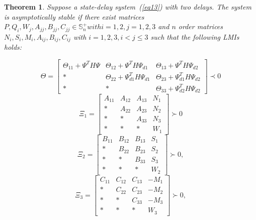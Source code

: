 \documentclass[a4paper]{cas-sc}
\newtheorem{theorem}{Theorem}
\begin{document}
\begin{theorem}
  Suppose a state-delay system~(\ref{eq13}) with two delays. The system is asymptotically stable if there exist matrices $P,Q_i,W_j,A_{jj},B_{jj},C_{jj}\in\mathbb{S}_n^+ with i=1,2,j=1,2,3$ and $n$ order matrices $N_i,S_i,M_i,A_{ij},B_{ij},C_{ij}$ with $i=1,2,3,i<j\le3$ such that the following LMIs holds:

  \begin{equation}
    \Theta  = \left[ {\begin{array}{*{20}{c}}
            {{\Theta _{11}} + {\Psi ^T}H\Psi } & {{\Theta _{12}} + {\Psi ^T}H{\Psi _{d1}}}    & {{\Theta _{13}} + {\Psi ^T}H{\Psi _{d2}}}    \\
            *                                  & {{\Theta _{22}} + \Psi _{d1}^TH{\Psi _{d1}}} & {{\Theta _{23}} + \Psi _{d1}^TH{\Psi _{d2}}} \\
            *                                  & *                                            & {{\Theta _{33}} + \Psi _{d2}^TH{\Psi _{d2}}}
          \end{array}} \right] \prec 0
    \label{eq42}
  \end{equation}
  \begin{equation}
    {\Xi _1} = \left[ {\begin{array}{*{20}{c}}
            {{A_{11}}} & {{A_{12}}} & {{A_{13}}} & {{N_1}} \\
            *          & {{A_{22}}} & {{A_{23}}} & {{N_2}} \\
            *          & *          & {{A_{33}}} & {{N_3}} \\
            *          & *          & *          & {{W_1}}
          \end{array}} \right] \succ 0
    \label{eq43}
  \end{equation}
  \begin{equation}
    {\Xi _2} = \left[ {\begin{array}{*{20}{c}}
            {{B_{11}}} & {{B_{12}}} & {{B_{13}}} & {{S_1}} \\
            *          & {{B_{22}}} & {{B_{23}}} & {{S_2}} \\
            *          & *          & {{B_{33}}} & {{S_3}} \\
            *          & *          & *          & {{W_2}}
          \end{array}} \right] \succ 0,
    \label{eq44}
  \end{equation}
  \begin{equation}
    {\Xi _3} = \left[ {\begin{array}{*{20}{c}}
            {{C_{11}}} & {{C_{12}}} & {{C_{13}}} & { - {M_1}} \\
            *          & {{C_{22}}} & {{C_{23}}} & { - {M_2}} \\
            *          & *          & {{C_{33}}} & { - {M_3}} \\
            *          & *          & *          & {{W_3}}
          \end{array}} \right] \succ 0,
    \label{eq45}
  \end{equation}


\end{theorem}
\end{document}
